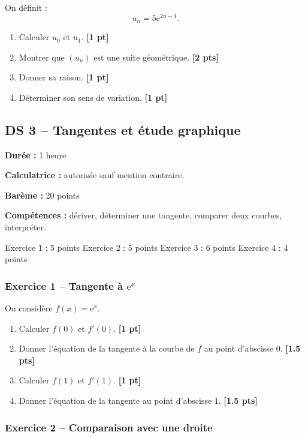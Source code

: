 \documentclass[11pt,a4paper]{article}
\newcommand{\e}{\mathrm{e}}
\newcommand{\pts}[1]{\hfill \textbf{[#1 pt]}}
\newcommand{\ptss}[1]{\hfill \textbf{[#1 pts]}}
\newcommand{\competences}[1]{\textbf{Compétences :} #1}
\newcommand{\calculatrice}{\textbf{Calculatrice :} autorisée sauf mention contraire.}
\newcommand{\duree}[1]{\textbf{Durée :} #1}
\newcommand{\bareme}[1]{\textbf{Barème :} #1}
\begin{document}
On définit :
\[
u_n=5\e^{2n-1}.
\]
\begin{enumerate}
    \item Calculer $u_0$ et $u_1$. \pts{1}
    \item Montrer que $(u_n)$ est une suite géométrique. \ptss{2}
    \item Donner sa raison. \pts{1}
    \item Déterminer son sens de variation. \pts{1}
\end{enumerate}

\newpage

\subsection*{DS 3 -- Tangentes et étude graphique}

\begin{sujetbox}
\duree{1 heure}

\calculatrice

\bareme{20 points}

\competences{dériver, déterminer une tangente, comparer deux courbes, interpréter.}
\end{sujetbox}

\begin{baremebox}
Exercice 1 : 5 points \quad
Exercice 2 : 5 points \quad
Exercice 3 : 6 points \quad
Exercice 4 : 4 points
\end{baremebox}

\subsubsection*{Exercice 1 -- Tangente à $\e^x$}

On considère $f(x)=\e^x$.
\begin{enumerate}
    \item Calculer $f(0)$ et $f'(0)$. \pts{1}
    \item Donner l'équation de la tangente à la courbe de $f$ au point d'abscisse $0$. \ptss{1.5}
    \item Calculer $f(1)$ et $f'(1)$. \pts{1}
    \item Donner l'équation de la tangente au point d'abscisse $1$. \ptss{1.5}
\end{enumerate}

\subsubsection*{Exercice 2 -- Comparaison avec une droite}
\end{document}
